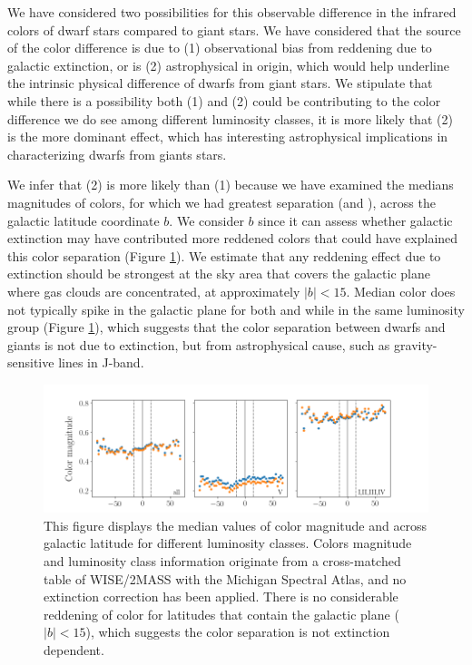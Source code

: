 We have considered two possibilities for this observable difference in the infrared colors of dwarf stars compared to giant stars. We have considered that the source of the color difference is due to (1) observational bias from reddening due to galactic extinction, or is (2) astrophysical in origin, which would help underline the intrinsic physical difference of dwarfs from giant stars. We stipulate that while there is a possibility both (1) and (2) could be contributing to the color difference we do see among different luminosity classes, it is more likely that (2) is the more dominant effect, which has interesting astrophysical implications in characterizing dwarfs from giants stars. 

We infer that (2) is more likely than (1) because we have examined the medians magnitudes of colors, for which we had greatest separation (\jwone and \jwtwo), across the galactic latitude coordinate $b$. We consider $b$ since it can assess whether galactic extinction may have contributed more reddened colors that could have explained this color separation (Figure \ref{fig:color-vs-b}). We estimate that any reddening effect due to extinction should be strongest at the sky area that covers the galactic plane where gas clouds are concentrated, at approximately $|b|<15$. Median color does not typically spike in the galactic plane for both \jwone and \jwtwo while in the same luminosity group (Figure \ref{fig:color-vs-b}), which suggests that the color separation between dwarfs and giants is not due to extinction, but from astrophysical cause, such as gravity-sensitive lines in J-band.


\begin{figure}
    \centering
    \includegraphics[width=1.0\textwidth,clip=true]{Figures/populations/plot-b-vs-color.png}
    \caption{This figure displays the median values of color magnitude \jwone and \jwtwo across galactic latitude for different luminosity classes. Colors magnitude and luminosity class information originate from a cross-matched table of WISE/2MASS with the Michigan Spectral Atlas, and no extinction correction has been applied. There is no considerable reddening of color for latitudes that contain the galactic plane ($|b|<15$), which suggests the color separation is not extinction dependent.}
    \label{fig:color-vs-b}
\end{figure}